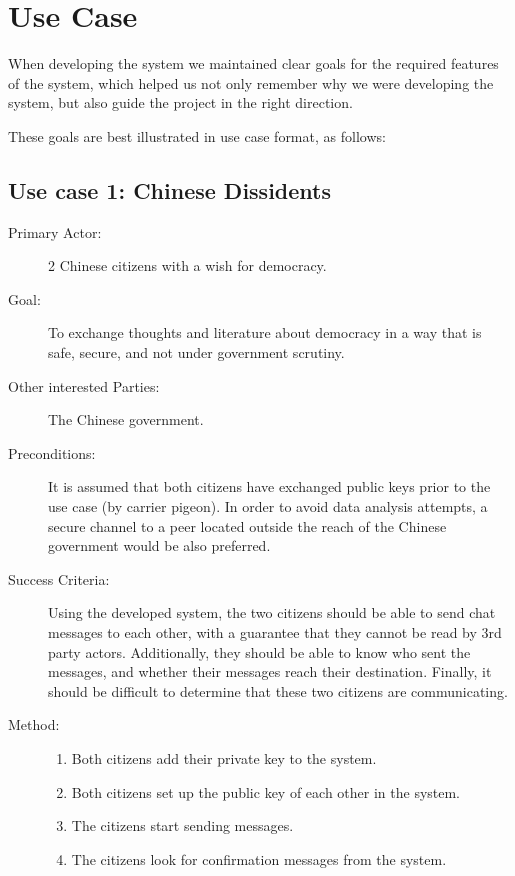 \section{Use Case}

When developing the system we maintained clear goals for the required features of the system, which helped us not only remember why we were developing the system, but also guide the project in the right direction.

These goals are best illustrated in use case format, as follows:

\subsection{Use case 1: Chinese Dissidents}
\begin{description}
\item[Primary Actor:] 2 Chinese citizens with a wish for democracy.
\item[Goal:] To exchange thoughts and literature about democracy in a way that is safe, secure, and not under government scrutiny.
\item[Other interested Parties:] The Chinese government.
\item[Preconditions:] It is assumed that both citizens have exchanged public keys prior to the use case (by carrier pigeon).
In order to avoid data analysis attempts, a secure channel to a peer located outside the reach of the Chinese government would be also preferred.
\item[Success Criteria:] Using the developed system, the two citizens should be able to send chat messages to each other, with a guarantee that they cannot be read by 3rd party actors.
Additionally, they should be able to know who sent the messages, and whether their messages reach their destination.
Finally, it should be difficult to determine that these two citizens are communicating.
\item[Method:]
\begin{enumerate}
\item Both citizens add their private key to the system.
\item Both citizens set up the public key of each other in the system.
\item The citizens start sending messages.
\item The citizens look for confirmation messages from the system.
\end{enumerate}
\end{description}

